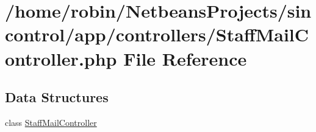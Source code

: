 \hypertarget{_staff_mail_controller_8php}{}\section{/home/robin/\+Netbeans\+Projects/sincontrol/app/controllers/\+Staff\+Mail\+Controller.php File Reference}
\label{_staff_mail_controller_8php}
\subsection*{Data Structures}
\begin{DoxyCompactItemize}
\item 
class \hyperlink{class_staff_mail_controller}{Staff\+Mail\+Controller}
\end{DoxyCompactItemize}
